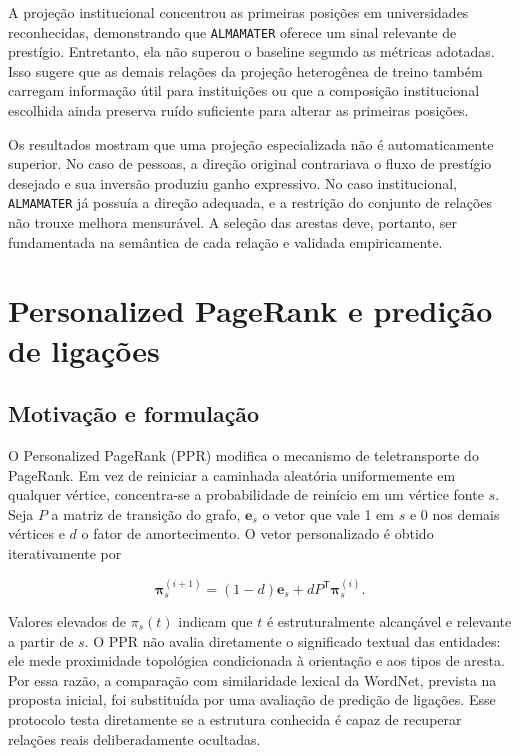 \documentclass[10pt,a4paper]{article}
\begin{document}
A projeção institucional concentrou as primeiras posições em universidades reconhecidas, demonstrando que \texttt{ALMAMATER} oferece um sinal relevante de prestígio. Entretanto, ela não superou o baseline segundo as métricas adotadas. Isso sugere que as demais relações da projeção heterogênea de treino também carregam informação útil para instituições ou que a composição institucional escolhida ainda preserva ruído suficiente para alterar as primeiras posições.

Os resultados mostram que uma projeção especializada não é automaticamente superior. No caso de pessoas, a direção original contrariava o fluxo de prestígio desejado e sua inversão produziu ganho expressivo. No caso institucional, \texttt{ALMAMATER} já possuía a direção adequada, e a restrição do conjunto de relações não trouxe melhora mensurável. A seleção das arestas deve, portanto, ser fundamentada na semântica de cada relação e validada empiricamente.

\section{Personalized PageRank e predição de ligações}

\subsection{Motivação e formulação}

O Personalized PageRank (PPR) modifica o mecanismo de teletransporte do PageRank. Em vez de reiniciar a caminhada aleatória uniformemente em qualquer vértice, concentra-se a probabilidade de reinício em um vértice fonte $s$. Seja $P$ a matriz de transição do grafo, $\mathbf{e}_s$ o vetor que vale 1 em $s$ e 0 nos demais vértices e $d$ o fator de amortecimento. O vetor personalizado é obtido iterativamente por

\begin{equation}
\boldsymbol{\pi}_s^{(i+1)}=(1-d)\mathbf{e}_s+dP^{\mathsf{T}}\boldsymbol{\pi}_s^{(i)}.
\label{eq:ppr}
\end{equation}

Valores elevados de $\pi_s(t)$ indicam que $t$ é estruturalmente alcançável e relevante a partir de $s$. O PPR não avalia diretamente o significado textual das entidades: ele mede proximidade topológica condicionada à orientação e aos tipos de aresta. Por essa razão, a comparação com similaridade lexical da WordNet, prevista na proposta inicial, foi substituída por uma avaliação de predição de ligações. Esse protocolo testa diretamente se a estrutura conhecida é capaz de recuperar relações reais deliberadamente ocultadas.
\end{document}
